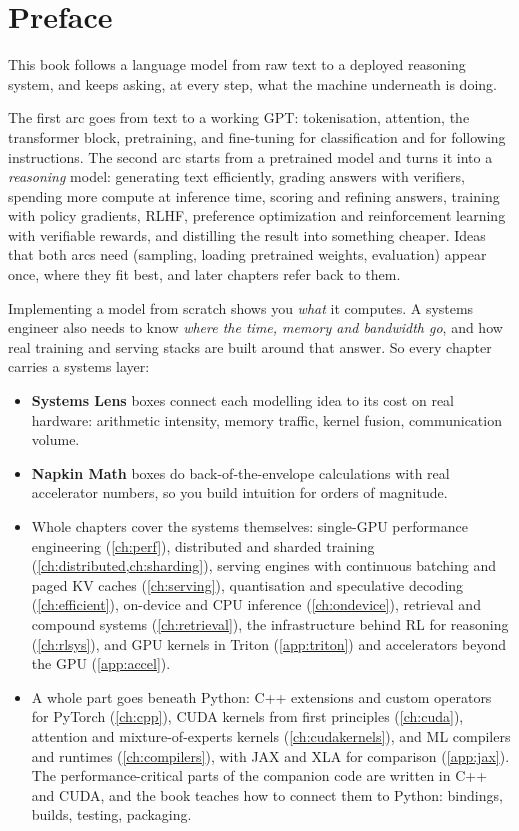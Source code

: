\chapter*{Preface}

This book follows a language model from raw text to a deployed reasoning system, and keeps
asking, at every step, what the machine underneath is doing.

The first arc goes from text to a working GPT: tokenisation, attention, the transformer block,
pretraining, and fine-tuning for classification and for following instructions. The second arc
starts from a pretrained model and turns it into a \emph{reasoning} model: generating text
efficiently, grading answers with verifiers, spending more compute at inference time, scoring and
refining answers, training with policy gradients, RLHF, preference optimization and reinforcement
learning with verifiable rewards, and distilling the result into something cheaper. Ideas that both
arcs need (sampling, loading pretrained weights, evaluation) appear once, where they fit best, and
later chapters refer back to them.

Implementing a model from scratch shows you \emph{what} it computes. A systems engineer also needs
to know \emph{where the time, memory and bandwidth go}, and how real training and serving stacks
are built around that answer. So every chapter carries a systems layer:

\begin{itemize}
  \item \textbf{Systems Lens} boxes connect each modelling idea to its cost on real hardware:
        arithmetic intensity, memory traffic, kernel fusion, communication volume.
  \item \textbf{Napkin Math} boxes do back-of-the-envelope calculations with real
        accelerator numbers, so you build intuition for orders of magnitude.
  \item Whole chapters cover the systems themselves: single-GPU performance engineering
        (\cref{ch:perf}), distributed and sharded training (\cref{ch:distributed,ch:sharding}),
        serving engines with continuous batching and paged KV caches (\cref{ch:serving}),
        quantisation and speculative decoding (\cref{ch:efficient}), on-device and CPU inference
        (\cref{ch:ondevice}), retrieval and compound systems (\cref{ch:retrieval}), the
        infrastructure behind RL for reasoning (\cref{ch:rlsys}), and GPU kernels in Triton
        (\cref{app:triton}) and accelerators beyond the GPU (\cref{app:accel}).
  \item A whole part goes beneath Python: C++ extensions and custom operators for PyTorch
        (\cref{ch:cpp}), CUDA kernels from first principles (\cref{ch:cuda}), attention and
        mixture-of-experts kernels (\cref{ch:cudakernels}), and ML compilers and runtimes
        (\cref{ch:compilers}), with JAX and XLA for comparison (\cref{app:jax}). The
        performance-critical parts of the companion code are written in C++ and CUDA, and the book
        teaches how to connect them to Python: bindings, builds, testing, packaging.
\end{itemize}

